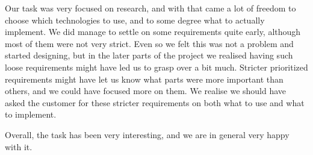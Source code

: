 Our task was very focused on research, and with that came a lot of freedom to choose which technologies to use, and to some degree what to actually implement. We did manage to settle on some requirements quite early, although most of them were not very strict. Even so we felt this was not a problem and started designing, but in the later parts of the project we realised having such loose requirements might have led us to grasp over a bit much. Stricter prioritized requirements might have let us know what parts were more important than others, and we could have focused more on them. We realise we should have asked the customer for these stricter requirements on both what to use and what to implement.

Overall, the task has been very interesting, and we are in general very happy with it.